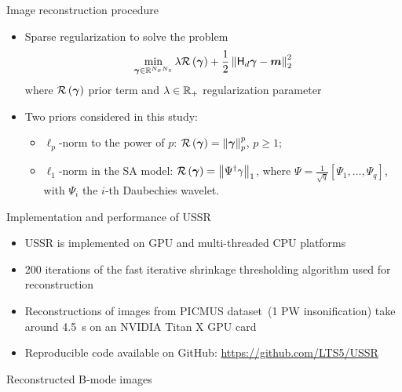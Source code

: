 {\begin{block}{Image reconstruction procedure}
\begin{itemize}
		\item Sparse regularization to solve the problem
		\begin{align}
			\label{eq_regularization_problem}
			\min \limits_{\bm{\gamma} \in \mathbb{R}^{N_xN_z}} \lambda \mathcal{R} \left(\bm{\gamma}\right) + \frac{1}{2} \left\lVert\mathsf{H}_d \bm{\gamma} - \bm{m}\right\rVert_{2}^2
		\end{align}
		where $\mathcal{R} \left(\bm{\gamma}\right)$ prior term and $\lambda \in \mathbb{R}_+$ regularization parameter
		\item Two priors considered in this study:
		\begin{itemize}
			\item $\ell_p$-norm to the power of $p$: $\mathcal{R}\left(\bm{\gamma}\right) = \left\lVert\bm{\gamma}\right\rVert_{p}^p$, $p \geq 1$;
			\item $\ell_1$-norm in the SA model: $\mathcal{R}\left(\bm{\gamma}\right) = \left\lVert\Psi^\dagger\gamma\right\rVert_{1}$, where $\Psi = \frac{1}{\sqrt{q}}\left[\Psi_1,...,\Psi_q\right]$, with $\Psi_i$ the $i$-th Daubechies wavelet.
		\end{itemize}
	\end{itemize}
\end{block}
\vfill
\begin{block}{Implementation and performance of USSR}
	\begin{itemize}
		\item USSR is implemented on GPU and multi-threaded CPU platforms
		\item \num{200} iterations of the fast iterative shrinkage thresholding algorithm used for reconstruction 
		\item Reconstructions of images from PICMUS dataset~(1 PW insonification) take around \SI{4.5}{\second} on an NVIDIA Titan X GPU card
		\item Reproducible code available on GitHub: \url{https://github.com/LTS5/USSR}
	\end{itemize}
\end{block}
\vfill
\begin{block}{Reconstructed B-mode images}
\newlength{\CohSubFigWidth}

\end{block}}
